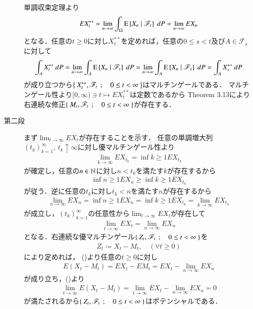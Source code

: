 \begin{prf}
\begin{description}
 				単調収束定理より
 				\begin{align}
 					E X^{**}_t
 					= \lim_{n \to \infty} \int_\Omega \operatorname{E} \left[ X_n \ \middle|\ \mathscr{F}_t \right]\ dP
 					= \lim_{n \to \infty} E X_n
 					\label{eq:chapter_1_Exercise_3_18_1}
 				\end{align}
 				となる．任意の$t \geq 0$に対し$X^{**}_t$を定めれば，任意の$0 \leq s < t$及び$A \in \mathscr{F}_s$に対して
 				\begin{align}
 					\int_A X^{**}_t\ dP
 					= \lim_{n \to \infty} \int_A \operatorname{E} \left[ X_n \ \middle|\ \mathscr{F}_t \right]\ dP 
 					= \lim_{n \to \infty} \int_A \operatorname{E} \left[ X_n \ \middle|\ \mathscr{F}_s \right]\ dP
 					= \int_A X^{**}_s\ dP
 					\label{eq:chapter_1_Exercise_3_18_3}
 				\end{align}
 				が成り立つから$\left\{\ X^{**}_t,\mathscr{F}_t\ \, ; \quad 0 \leq t < \infty\ \right\}$はマルチンゲールである．
 				マルチンゲール性より$[0,\infty) \ni t \longmapsto EX^{**}_t$は定数であるから
 				Theorem 3.13により右連続な修正$\left\{\ M_t,\mathscr{F}_t\ \, ; \quad 0 \leq t < \infty\ \right\}$が存在する．
 		
 			\item[第二段]
 				まず$\lim_{t \to \infty} EX_t$が存在することを示す．
 				任意の単調増大列$(t_k)_{k=1}^\infty,\ t_k \uparrow \infty$に対し優マルチンゲール性より
	 			\begin{align}
	 				\lim_{k \to \infty} EX_{t_k} = \inf{k \geq 1}{EX_{t_k}}
	 			\end{align}
	 			が確定し，任意の$n \in \mathbb{N}$に対し$n < t_k$を満たす$k$が存在するから
	 			\begin{align}
	 				\inf{n \geq 1}{EX_n} \geq \inf{k \geq 1}{EX_{t_k}}
	 			\end{align}
	 			が従う．逆に任意の$t_k$に対し$t_k < n$を満たす$n$が存在するから
	 			\begin{align}
	 				\lim_{n \to \infty} EX_n = \inf{n \geq 1}{EX_n} 
	 				= \inf{k \geq 1}{EX_{t_k}} = \lim_{k \to \infty} EX_{t_k}
	 			\end{align}
	 			が成立し，$(t_k)_{k=1}^\infty$の任意性から$\lim_{t \to \infty} EX_t$が存在して
	 			\begin{align}
	 				\lim_{t \to \infty} EX_t = \lim_{n \to \infty} EX_n
	 				\label{eq:chapter_1_Exercise_3_18_2}
	 			\end{align}
	 			となる．右連続な優マルチンゲール$\left\{\ Z_t,\mathscr{F}_t\ \, ; \quad 0 \leq t < \infty\ \right\}$を
	 			\begin{align}
 					Z_t \coloneqq X_t - M_t,
 					\quad (\forall t \geq 0)
 				\end{align}
 				により定めれば，
 				()より任意の$t \geq 0$に対し
 				\begin{align}
 					E(X_t - M_t)
 					= E X_t - E M_t
 					= EX_t - \lim_{n \to \infty} E X_n
 				\end{align}
 				が成り立ち，()より
 				\begin{align}
 					\lim_{t \to \infty} E(X_t - M_t)
 					= \lim_{t \to \infty} E X_t - \lim_{n \to \infty} E X_n
 					= 0
 				\end{align}
 				が満たされるから$\left\{\ Z_t,\mathscr{F}_t\ \, ; \quad 0 \leq t < \infty\ \right\}$はポテンシャルである．
			

\end{description}
\end{prf}
